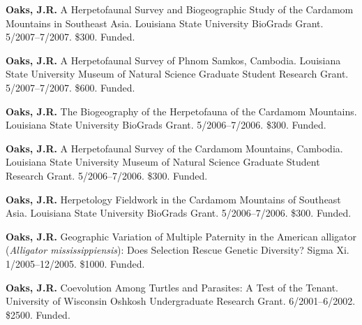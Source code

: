 {\myHangIndent
\textbf{Oaks, J.R.}
A Herpetofaunal Survey and Biogeographic Study of the Cardamom Mountains in
Southeast Asia.
Louisiana State University BioGrads Grant.
5/2007--7/2007.
\$300.
Funded.

\myHangIndent
\textbf{Oaks, J.R.}
A Herpetofaunal Survey of Phnom Samkos, Cambodia.
Louisiana State University Museum of Natural Science Graduate Student Research
Grant.
5/2007--7/2007.
\$600.
Funded.

\myHangIndent
\textbf{Oaks, J.R.}
The Biogeography of the Herpetofauna of the Cardamom Mountains.
Louisiana State University BioGrads Grant.
5/2006--7/2006.
\$300.
Funded.

\myHangIndent
\textbf{Oaks, J.R.}
A Herpetofaunal Survey of the Cardamom Mountains, Cambodia.
Louisiana State University Museum of Natural Science Graduate Student Research
Grant.
5/2006--7/2006.
\$300.
Funded.

\myHangIndent
\textbf{Oaks, J.R.}
Herpetology Fieldwork in the Cardamom Mountains of Southeast Asia.
Louisiana State University BioGrads Grant.
5/2006--7/2006.
\$300.
Funded.

\myHangIndent
\textbf{Oaks, J.R.}
Geographic Variation of Multiple Paternity in the American alligator
(\emph{Alligator mississippiensis}): Does Selection Rescue Genetic Diversity?
Sigma Xi.
1/2005--12/2005.
\$1000.
Funded.

\myHangIndent
\textbf{Oaks, J.R.}
Coevolution Among Turtles and Parasites: A Test of the Tenant.
University of Wisconsin Oshkosh Undergraduate Research Grant.
6/2001--6/2002.
\$2500.
Funded.
}
